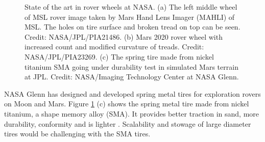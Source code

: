 \documentclass{article}
\begin{document}
\begin{figure}[hbt!]
\begin{minipage}{0.32\textwidth}
    \end{minipage}
        \begin{minipage}{0.32\textwidth}
        \centering
    \end{minipage}
    \caption{State of the art in rover wheels at NASA. (a) The left middle wheel of MSL rover image taken by Mars Hand Lens Imager (MAHLI) of MSL. The holes on tire surface and broken tread on top can be seen. Credit: NASA/JPL/PIA21486. (b) Mars 2020 rover wheel with increased count and modified curvature of treads. Credit: NASA/JPL/PIA23269. (c) The spring tire made from nickel titanium SMA going under durability test in simulated Mars terrain at JPL. Credit: NASA/Imaging Technology Center at NASA Glenn.}
    \label{soa_wheels}
\end{figure}

NASA Glenn has designed and developed spring metal tires for exploration rovers on Moon and Mars. Figure \ref{soa_wheels} (c) shows the spring metal tire made from nickel titanium, a shape memory alloy (SMA). It provides better traction in sand, more durability, conformity and is lighter \cite{padula2018shape}. Scalability and stowage of large diameter tires would be challenging with the SMA tires. 
\end{document}
